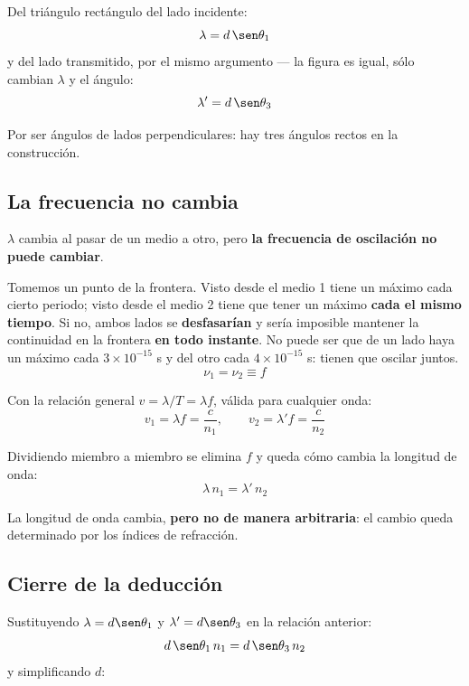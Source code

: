 \documentclass[12pt,a4paper]{article}
\begin{document}
Del triángulo rectángulo del lado incidente:
\[
\lambda = d\,\sen\theta_1
\]
y del lado transmitido, por el mismo argumento --- la figura es igual, sólo
cambian $\lambda$ y el ángulo:
\[
\lambda' = d\,\sen\theta_3
\]

\begin{notebox}
Por ser ángulos de lados perpendiculares: hay tres ángulos rectos en la
construcción.
\end{notebox}

\subsection{La frecuencia no cambia}

$\lambda$ cambia al pasar de un medio a otro, pero \textbf{la frecuencia de
oscilación no puede cambiar}.

\begin{keybox}
Tomemos un punto de la frontera. Visto desde el medio 1 tiene un máximo cada
cierto periodo; visto desde el medio 2 tiene que tener un máximo \textbf{cada el
mismo tiempo}. Si no, ambos lados se \textbf{desfasarían} y sería imposible
mantener la continuidad en la frontera \textbf{en todo instante}. No puede ser
que de un lado haya un máximo cada $3\times 10^{-15}$ s y del otro cada
$4\times 10^{-15}$ s: tienen que oscilar juntos.
\[
\nu_1 = \nu_2 \equiv f
\]
\end{keybox}

Con la relación general $v = \lambda/T = \lambda f$, válida para cualquier onda:
\[
v_1 = \lambda f = \frac{c}{n_1}, \qquad v_2 = \lambda' f = \frac{c}{n_2}
\]

Dividiendo miembro a miembro se elimina $f$ y queda cómo cambia la longitud de
onda:
\[
\boxed{\ \lambda\, n_1 = \lambda'\, n_2\ }
\]

\begin{notebox}[Lectura]
La longitud de onda cambia, \textbf{pero no de manera arbitraria}: el cambio
queda determinado por los índices de refracción.
\end{notebox}

\subsection{Cierre de la deducción}

Sustituyendo $\lambda = d\sen\theta_1$ y $\lambda' = d\sen\theta_3$ en la
relación anterior:
\[
d\,\sen\theta_1\, n_1 = d\,\sen\theta_3\, n_2
\]
y simplificando $d$:
\end{document}
